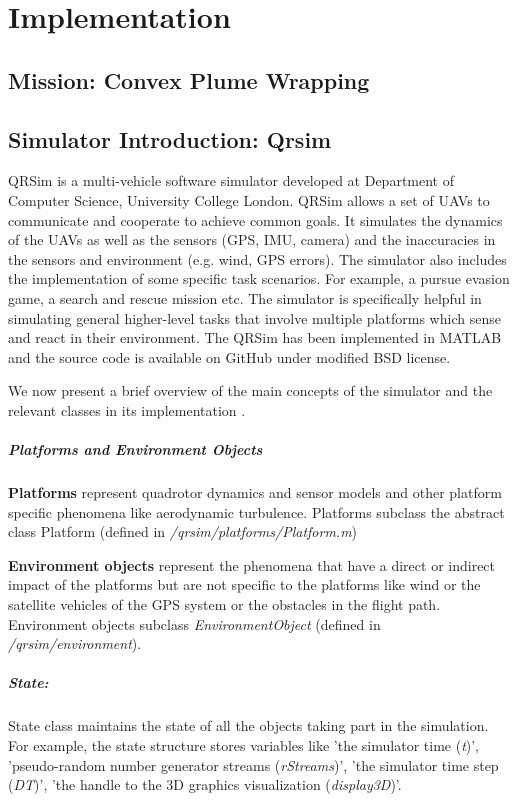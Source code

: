 \chapter{Implementation}

\section{Mission: Convex Plume Wrapping}
\section{Simulator Introduction: Qrsim}
QRSim \cite{denardi2013rn} is a multi-vehicle software simulator developed at Department of Computer Science, University College London. QRSim allows a set of UAVs to communicate and cooperate to achieve common goals. It simulates the dynamics of the UAVs as well as the sensors (GPS, IMU, camera) and the inaccuracies in the sensors and environment (e.g. wind, GPS errors). The simulator also includes the implementation of some specific task scenarios. For example, a pursue evasion game, a search and rescue mission etc. The simulator is specifically helpful in simulating general higher-level tasks that involve multiple platforms which sense and react in their environment. The QRSim has been implemented in MATLAB and the source code is available on GitHub \cite{qrsim_github} under modified BSD license.

We now present a brief overview of the main concepts of the simulator and the relevant classes in its implementation \cite{qrsim_github_manual}.

\paragraph{Platforms and Environment Objects}
\textbf{Platforms} represent quadrotor dynamics and sensor models and other platform specific phenomena like aerodynamic turbulence. Platforms subclass the abstract class Platform (defined in \emph{/qrsim/platforms/Platform.m})

\textbf{Environment objects} represent the phenomena that have a direct or indirect impact of the platforms but are not specific to the platforms like wind or the satellite vehicles of the GPS system or the obstacles in the flight path. Environment objects subclass \emph{EnvironmentObject} (defined in \emph{/qrsim/environment}).
\paragraph{State:} State class maintains the state of all the objects taking part in the simulation. For example, the state structure stores variables like 'the simulator time (\emph{t})', 'pseudo-random number generator streams (\emph{rStreams})', 'the simulator time step (\emph{DT})', 'the handle to the 3D graphics visualization (\emph{display3D})'.
